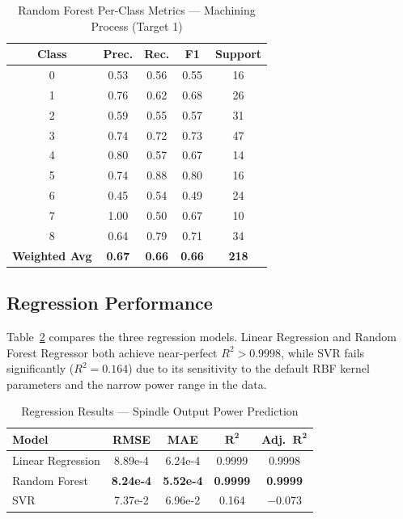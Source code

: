 \documentclass[conference]{IEEEtran}
\begin{document}
\begin{table}[h]
\caption{Random Forest Per-Class Metrics — Machining Process (Target 1)}
\label{tab:rf_detail}
\centering
\begin{tabular}{ccccc}
\toprule
\textbf{Class} & \textbf{Prec.} & \textbf{Rec.} & \textbf{F1} & \textbf{Support} \\
\midrule
0 & 0.53 & 0.56 & 0.55 & 16 \\
1 & 0.76 & 0.62 & 0.68 & 26 \\
2 & 0.59 & 0.55 & 0.57 & 31 \\
3 & 0.74 & 0.72 & 0.73 & 47 \\
4 & 0.80 & 0.57 & 0.67 & 14 \\
5 & 0.74 & 0.88 & 0.80 & 16 \\
6 & 0.45 & 0.54 & 0.49 & 24 \\
7 & 1.00 & 0.50 & 0.67 & 10 \\
8 & 0.64 & 0.79 & 0.71 & 34 \\
\midrule
\textbf{Weighted Avg} & \textbf{0.67} & \textbf{0.66} & \textbf{0.66} & \textbf{218} \\
\bottomrule
\end{tabular}
\end{table}

\subsection{Regression Performance}

Table~\ref{tab:reg} compares the three regression models. Linear Regression and Random
Forest Regressor both achieve near-perfect $R^2 > 0.9998$, while SVR fails significantly
($R^2 = 0.164$) due to its sensitivity to the default RBF kernel parameters and the
narrow power range in the data.

\begin{table}[h]
\caption{Regression Results — Spindle Output Power Prediction}
\label{tab:reg}
\centering
\begin{tabular}{lcccc}
\toprule
\textbf{Model} & \textbf{RMSE} & \textbf{MAE} & $\mathbf{R^2}$ & \textbf{Adj.}~$\mathbf{R^2}$ \\
\midrule
Linear Regression    & 8.89e-4 & 6.24e-4 & 0.9999 & 0.9998 \\
Random Forest        & \textbf{8.24e-4} & \textbf{5.52e-4} & \textbf{0.9999} & \textbf{0.9999} \\
SVR                  & 7.37e-2 & 6.96e-2 & 0.164  & $-$0.073 \\
\bottomrule
\end{tabular}
\end{table}
\end{document}
